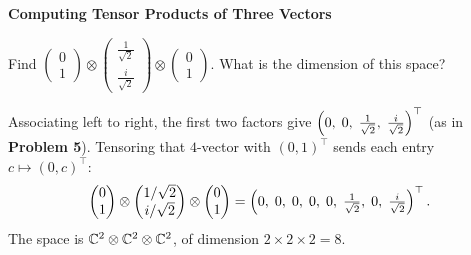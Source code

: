 \documentclass[a4paper, 10pt]{article}
\begin{document}
\begin{problem}
\textbf{Computing Tensor Products of Three Vectors}
\par Find \( \displaystyle \begin{pmatrix}
	0 \\ 1
\end{pmatrix} \otimes \begin{pmatrix}
	\frac{1}{\sqrt{2}} \\ \frac{i}{\sqrt{2}}
\end{pmatrix} \otimes \begin{pmatrix}
	0 \\ 1
\end{pmatrix} \).
What is the dimension of this space?
\end{problem}

\begin{solution}
	\noindent Associating left to right, the first two factors give \( \left(0,\; 0,\; \tfrac{1}{\sqrt{2}},\; \tfrac{i}{\sqrt{2}}\right)^{\top} \) (as in \textbf{Problem 5}).
	Tensoring that \( 4 \)-vector with \( (0, 1)^{\top} \) sends each entry \( c \mapsto (0, c)^{\top} \):
	\[
		\begin{pmatrix} 0 \\ 1 \end{pmatrix} \otimes
		\begin{pmatrix} 1/\sqrt{2} \\ i/\sqrt{2} \end{pmatrix} \otimes
		\begin{pmatrix} 0 \\ 1 \end{pmatrix}
		= \left( 0,\; 0,\; 0,\; 0,\; 0,\; \tfrac{1}{\sqrt{2}},\; 0,\; \tfrac{i}{\sqrt{2}} \right)^{\top}.
	\]
	\noindent The space is \( \mathbb{C}^2 \otimes \mathbb{C}^2 \otimes \mathbb{C}^2 \), of dimension \( 2 \times 2 \times 2 = 8 \).
\end{solution}
\end{document}

